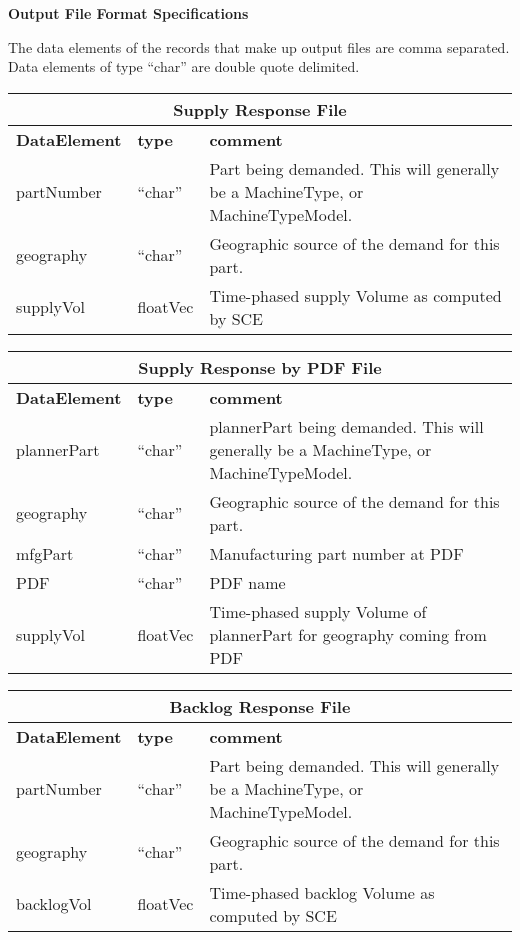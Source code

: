 \clearpage

\noindent
{\bf Output File Format Specifications}

The data elements of the records that make up output files are comma 
separated.  Data elements of type ``char'' are double quote delimited. 

\begin{tabular}{llp{4in}}
\multicolumn{3}{c}{{\bf Supply Response File}}\\ \hline\hline
{\bf DataElement} &  {\bf type}  &   {\bf comment} \\ \hline
partNumber  & ``char'' &     Part being demanded.  This will generally be a
                       MachineType, or MachineTypeModel. \\
geography   & ``char''  &    Geographic source of the demand for this part. \\
supplyVol   & floatVec&  Time-phased supply Volume as computed by SCE \\
\end{tabular}

\vspace{.5in}

\begin{tabular}{llp{4in}}
\multicolumn{3}{c}{{\bf Supply Response by PDF File}}\\ \hline\hline
{\bf DataElement} &  {\bf type}  &   {\bf comment} \\ \hline
plannerPart  & ``char'' &     plannerPart being demanded.  
           This will generally be a
                       MachineType, or MachineTypeModel. \\
geography   & ``char''  &    Geographic source of the demand for this part. \\
mfgPart     & ``char''  & Manufacturing part number at PDF \\
PDF         & ``char''  & PDF name \\
supplyVol   & floatVec&  Time-phased supply Volume of plannerPart for 
    geography coming from PDF  
\end{tabular}


\vspace{.5in}

\begin{tabular}{llp{4in}}
\multicolumn{3}{c}{{\bf Backlog Response File}}\\ \hline\hline
{\bf DataElement} &  {\bf type}  &   {\bf comment} \\ \hline
partNumber  & ``char'' &     Part being demanded.  This will generally be a
                       MachineType, or MachineTypeModel. \\
geography   & ``char''  &    Geographic source of the demand for this part. \\
backlogVol   & floatVec&  Time-phased backlog Volume as computed by SCE \\
\end{tabular}

